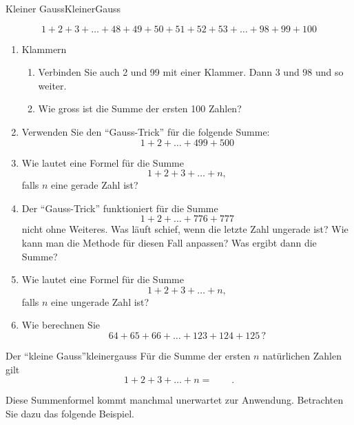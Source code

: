 \begin{LA}
    {Kleiner Gauss}{KleinerGauss}

    \[
        1+2+3+\dots+48+49+50+51+52+53+\dots+98+99+100
    \]
    \vspace*{5cm}
    \begin{enumerate}
        \item Klammern
              \begin{enumerate}
                  \item Verbinden Sie auch 2 und 99 mit einer Klammer. Dann 3 und 98 und so weiter.
                  \item Wie gross ist die Summe der ersten 100 Zahlen?
              \end{enumerate}

        \item Verwenden Sie den ``Gauss-Trick'' für die folgende Summe:
              \[
                  1+2+\dots+499+500
              \]

        \item Wie lautet eine Formel für die Summe
              \[
                  1+2+3+\dots+n,
              \]
              falls \(n\) eine gerade Zahl ist?

        \item Der ``Gauss-Trick'' funktioniert für die Summe
              \[
                  1+2+\dots+776+777
              \]
              nicht ohne Weiteres. Was läuft schief, wenn die letzte Zahl ungerade ist?
              Wie kann man die Methode für diesen Fall anpassen?
              Was ergibt dann die Summe?

        \item Wie lautet eine Formel für die Summe
              \[
                  1+2+3+\dots+n,
              \]
              falls \(n\) eine ungerade Zahl ist?

        \item Wie berechnen Sie
              \[
                  64+65+66+\dots+123+124+125\,?
              \]

    \end{enumerate}
\end{LA}


\clearpage
\begin{satz}{Der ``kleine Gauss''}{kleinergauss}
    Für die Summe der ersten \(n\) natürlichen Zahlen gilt
    \[
        1+2+3+\dots+n=\qquad.
    \]
\end{satz}

Diese Summenformel kommt manchmal unerwartet zur Anwendung. Betrachten Sie dazu das folgende Beispiel.

